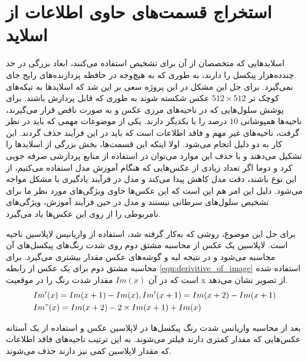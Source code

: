 \section{استخراج قسمت‌های حاوی اطلاعات از اسلاید}\label{subsec:استخراج قسمت‌های حاوی اطلاعات از اسلاید}

اسلاید‌هایی که متخصصان از آن برای تشخیص استفاده می‌کنند، ابعاد بزرگی در حد چند‌ده‌هزار پیکسل را دارند، به طوری که به هیچ‌وجه در
حافظه پردازنده‌های رایج جای نمی‌گیرد.
برای حل این مشکل در این پروژه سعی بر این شد که اسلاید‌ها به تیکه‌های کوچک تر
$512\times512$
 عکس شکسته شوند به طوری که قابل پردازش باشند.
 برای پوشش سلول‌هایی که در ناحیه‌های مرزی عکس و به صورت ناقص قرار می‌گیرند، ناحیه‌‌ها همپوشانی $10$ درصد را با یکدیگر دارند.
یکی از موضوعات مهمی که باید در نظر گرفت، ناحیه‌های غیر مهم و فاقد اطلاعات است که باید در این فرآیند حذف گردند. این کار به دو دلیل انجام می‌شود.
اولا اینکه این قسمت‌ها، بخش بزرگی از اسلاید‌ها را تشکیل می‌دهند و با حذف این موارد می‌توان در استفاده از منابع پردازشی صرفه جویی کرد
و دوما اگر تعداد زیادی از عکس‌هایی که هنگام آموزش مدل استفاده می‌کنیم، از این نوع باشند، دقت مدل کاهش پیدا می‌کند و مدل در فرآیند یادگیری با مشکل مواجه می‌شود.
دلیل این امر هم این است که این عکس‌ها حاوی ویژگی‌های مورد نظر ما برای تشخیص سلول‌های سرطانی نیستند و مدل در حین فرآیند آموزش، ویژگی‌های نامربوطی را از روی این عکس‌ها یاد می‌گیرد.

برای حل این موضوع، روشی که به‌کار گرفته شد، استفاده از واریانیس لاپلاسین ناحیه است.
لاپلاسین یک عکس از محاسبه مشتق دوم روی شدت رنگ‌های پیکسل‌های آن محاسبه می‌شود
و در نتیجه لبه و گوشه‌های عکس مقدار بیشتری می‌گیرد.
برای محاسبه مشتق دوم برای یک عکس از رابطه \ref{eqn:derivitive_of_image} استفاده شده است که در آن $Im(x)$ مقدار شدت رنگ را در موقعیت x از تصویر نشان می‌دهد.
\begin{equation}
	\label{eqn:derivitive_of_image}
		\begin{split}
			   & Im'(x) = Im(x+1) - Im(x), Im'(x+1) = Im(x+2) - Im(x+1)\\
			   & Im"(x) = Im(x+2) - 2 \times Im(x+1) + Im(x)
		\end{split}
\end{equation}

بعد از محاسبه واریانس شدت رنگ پیکسل‌ها در لاپلاسین عکس و استفاده از یک آستانه عکس‌هایی که مقدار کمتری دارند فیلتر می‌شوند.
به این ترتیب ناحیه‌های فاقد اطلاعات که مقدار لاپلاسین کمی نیز دارند حذف می‌شوند.

